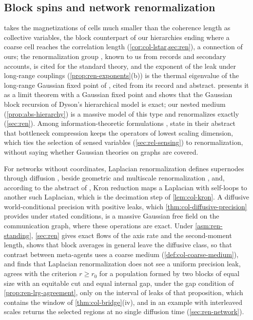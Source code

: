 \subsection{Block spins and network renormalization}\label{sec:rel-network}

\citet{kadanoff1966scaling} takes the magnetizations of cells much smaller than the coherence length as collective variables, the block counterpart of our hierarchies ending where a coarse cell reaches the correlation length (\cref{cor:col-lstar,sec:ren}), a connection of ours; the renormalization group \citep{wilson1971renormalization,wilson1974renormalization,cardy1996scaling}, known to us from records and secondary accounts, is cited for the standard theory, and the exponent of the leak under long-range couplings (\cref{prop:ren-exponents}(b)) is the thermal eigenvalue of the long-range Gaussian fixed point of \citet{fisher1972critical}, cited from its record and abstract. \citet{jonalasinio2001renormalization} presents it as a limit theorem with a Gaussian fixed point and shows that the Gaussian block recursion of Dyson's hierarchical model \citep{dyson1969existence} is exact; our nested medium (\cref{prop:abs-hierarchy}) is a massive model of this type and renormalizes exactly (\cref{sec:ren}). Among information-theoretic formulations \citep{mehta2014exact,beny2015information,kochjanusz2018mutual}, \citet{gordon2021relevance} state in their abstract that bottleneck compression keeps the operators of lowest scaling dimension, which ties the selection of sensed variables (\cref{sec:rel-sensing}) to renormalization, without saying whether Gaussian theories on graphs are covered.

For networks without coordinates, Laplacian renormalization defines supernodes through diffusion \citep{villegas2023laplacian}, beside geometric and multiscale renormalization \citep{garciaperez2018multiscale,garuccio2023multiscale,gabrielli2025network}, and, according to the abstract of \citet{dorfler2013kron}, Kron reduction maps a Laplacian with self-loops to another such Laplacian, which is the decimation step of \cref{lem:col-kron}. A diffusive world-conditional precision with positive leaks, which \cref{thm:col-diffusive-precision} provides under stated conditions, is a massive Gaussian free field on the communication graph, where these operations are exact. Under \cref{asm:ren-standing}, \cref{sec:ren} gives exact flows of the axis rate and the second-moment length, shows that block averages in general leave the diffusive class, so that contrast between meta-agents uses a coarse medium (\cref{def:col-coarse-medium}), and finds that Laplacian renormalization does not see a uniform precision leak, agrees with the criterion $r\ge r_0$ for a population formed by two blocks of equal size with an equitable cut and equal internal gap, under the gap condition of \cref{prop:ren-lrg-agreement}, only on the interval of leaks of that proposition, which contains the window of \cref{thm:col-bridge}(iv), and in an example with interleaved scales returns the selected regions at no single diffusion time (\cref{sec:ren-network}).

